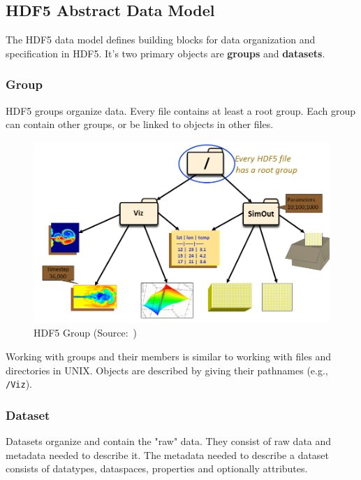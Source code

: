 \documentclass[thesis=M,english]{FITthesis}[2019/12/23]
\begin{document}
\subsection{HDF5 Abstract Data Model}

The HDF5 data model defines building blocks for data organization and specification in HDF5.
It's two primary objects are \textbf{groups} and \textbf{datasets}.

\subsubsection{Group}

HDF5 groups organize data. Every file contains at least a root group.
Each group can contain other groups, or be linked to objects in other files.

\begin{figure}[!h]
    \centering
    \includegraphics[scale=0.3]{static/group.png}
    \caption{HDF5 Group (Source:~\cite{hdf5})}
\end{figure}

Working with groups and their members is similar to working with files and directories in UNIX.
Objects are described by giving their pathnames (e.g., \texttt{/Viz}).

\subsubsection{Dataset}

Datasets organize and contain the "raw" data. They consist of raw data and metadata needed to describe it.
The metadata needed to describe a dataset consists of datatypes, dataspaces, properties and optionally
attributes.
\end{document}
